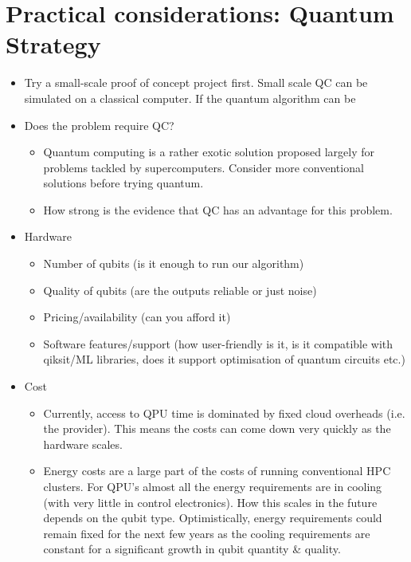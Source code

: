 \documentclass{book}
\begin{document}
\section{Practical considerations: Quantum Strategy}

\begin{itemize}
    \item Try a small-scale proof of concept project first. Small scale QC can be simulated on a classical computer. If the quantum algorithm can be 

    \item Does the problem require QC?
        \begin{itemize}
            \item Quantum computing is a rather exotic solution proposed largely for problems tackled by supercomputers. Consider more conventional solutions before trying quantum.
            \item How strong is the evidence that QC has an advantage for this problem.
        \end{itemize}
    \item Hardware
        \begin{itemize}
            \item Number of qubits (is it enough to run our algorithm)
            \item Quality of qubits (are the outputs reliable or just noise)
            \item Pricing/availability (can you afford it)
            \item Software features/support (how user-friendly is it, is it compatible with qiksit/ML libraries, does it support optimisation of quantum circuits etc.)
        \end{itemize}
    \item Cost
        \begin{itemize}
            \item Currently, access to QPU time is dominated by fixed cloud overheads (i.e. the provider). This means the costs can come down very quickly as the hardware scales.
            \item Energy costs are a large part of the costs of running conventional HPC clusters. For QPU's almost all the energy requirements are in cooling (with very little in control electronics). How this scales in the future depends on the qubit type. Optimistically, energy requirements could remain fixed for the next few years as the cooling requirements are constant for a significant growth in qubit quantity \& quality.
        \end{itemize}
\end{itemize}
\end{document}
